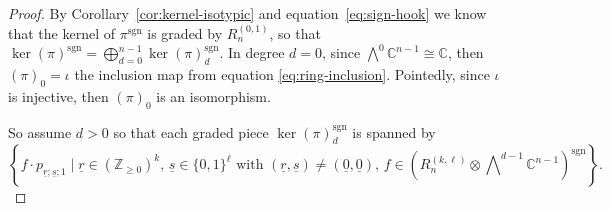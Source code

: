 \documentclass[11pt, reqno]{amsart}
\theoremstyle{definition}
\theoremstyle{remark}
\numberwithin{equation}{section}
\newcommand{\0}{\emptyset}
\newcommand{\C}{\mathbb{C}}
\renewcommand{\r}{\underline{r}}
\newcommand{\s}{\underline{s}}
\DeclareMathOperator{\sgn}{sgn}
\begin{document}
\begin{proof}
    By Corollary~\ref{cor:kernel-isotypic} and equation~\eqref{eq:sign-hook} we know that the kernel of $\pi^{\sgn}$ is graded  by $R_n^{(0,1)}$, so that $\ker(\pi)^{\sgn} = \bigoplus_{d=0}^{n-1} \ker(\pi)^{\sgn}_d$. 
    In degree $d=0$, since $\bigwedge\nolimits^0 \C^{n-1} \cong \C$, then $(\pi)_0 = \iota$ the inclusion map from equation \eqref{eq:ring-inclusion}. Pointedly, since $\iota$ is injective, then $(\pi)_0$ is an isomorphism. 

    So assume $d>0$ so that each graded piece $\ker(\pi)_d^{\sgn}$ is spanned by 
     \[
        \left\{  f \cdot p_{\r;\s;1}  \mid  \r \in (\mathbb{Z}_{\geq 0})^{k},\, 
    \s \in \{0,1\}^{\ell} \text{ with  } (\r,\s) \neq (\underline{0}, \underline{0}),\,
        f \in  \left(R_n^{(k,\ell)} \otimes \bigwedge\nolimits^{d-1} \C^{n-1}\right)^{\sgn} \right\}.
    \] 
   

\end{proof}
\end{document}
